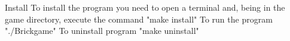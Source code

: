 \documentclass{article}
\begin{document}
Install
To install the program you need to open a terminal and, being in the game directory, execute the command "make install"
To run the program "./Brickgame"
To uninstall program "make uninstall"
\end{document}
